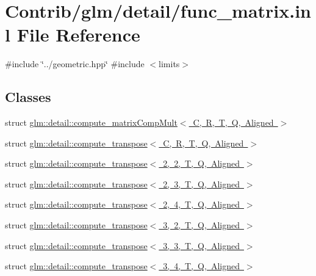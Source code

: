 \hypertarget{func__matrix_8inl}{}\section{Contrib/glm/detail/func\+\_\+matrix.inl File Reference}
\label{func__matrix_8inl}
{\ttfamily \#include \char`\"{}../geometric.\+hpp\char`\"{}}\newline
{\ttfamily \#include $<$limits$>$}\newline
\subsection*{Classes}
\begin{DoxyCompactItemize}
\item 
struct \mbox{\hyperlink{structglm_1_1detail_1_1compute__matrix_comp_mult}{glm\+::detail\+::compute\+\_\+matrix\+Comp\+Mult$<$ C, R, T, Q, Aligned $>$}}
\item 
struct \mbox{\hyperlink{structglm_1_1detail_1_1compute__transpose}{glm\+::detail\+::compute\+\_\+transpose$<$ C, R, T, Q, Aligned $>$}}
\item 
struct \mbox{\hyperlink{structglm_1_1detail_1_1compute__transpose_3_012_00_012_00_01_t_00_01_q_00_01_aligned_01_4}{glm\+::detail\+::compute\+\_\+transpose$<$ 2, 2, T, Q, Aligned $>$}}
\item 
struct \mbox{\hyperlink{structglm_1_1detail_1_1compute__transpose_3_012_00_013_00_01_t_00_01_q_00_01_aligned_01_4}{glm\+::detail\+::compute\+\_\+transpose$<$ 2, 3, T, Q, Aligned $>$}}
\item 
struct \mbox{\hyperlink{structglm_1_1detail_1_1compute__transpose_3_012_00_014_00_01_t_00_01_q_00_01_aligned_01_4}{glm\+::detail\+::compute\+\_\+transpose$<$ 2, 4, T, Q, Aligned $>$}}
\item 
struct \mbox{\hyperlink{structglm_1_1detail_1_1compute__transpose_3_013_00_012_00_01_t_00_01_q_00_01_aligned_01_4}{glm\+::detail\+::compute\+\_\+transpose$<$ 3, 2, T, Q, Aligned $>$}}
\item 
struct \mbox{\hyperlink{structglm_1_1detail_1_1compute__transpose_3_013_00_013_00_01_t_00_01_q_00_01_aligned_01_4}{glm\+::detail\+::compute\+\_\+transpose$<$ 3, 3, T, Q, Aligned $>$}}
\item 
struct \mbox{\hyperlink{structglm_1_1detail_1_1compute__transpose_3_013_00_014_00_01_t_00_01_q_00_01_aligned_01_4}{glm\+::detail\+::compute\+\_\+transpose$<$ 3, 4, T, Q, Aligned $>$}}
\item 

\end{DoxyCompactItemize}
